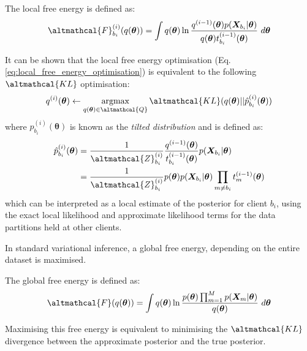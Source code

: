 \begin{definition}
	The local free energy is defined as:
	\begin{align}
	\altmathcal{F}_{b_i}^{(i)}(q(\bm{\theta})) = \int q(\bm{\theta}) \ln \frac{q^{(i-1)}(\bm{\theta}) p(\bm{X}_{b_i}|\bm{\theta})}{q(\bm{\theta}) t_{b_i}^{(i-1)}(\bm{\theta})}\ d\bm{\theta} \label{eq:def-local-free-energy}
	\end{align}
\end{definition}
It can be shown that the local free energy optimisation (Eq. \ref{eq:local_free_energy_optimisation}) is equivalent to the following $\altmathcal{KL}$ optimisation:
\begin{align}
q^{(i)}(\bm{\theta}) \leftarrow  \mathop{\mathrm{argmax}}_{q(\bm{\theta}) \in \altmathcal{Q}} \altmathcal{KL}(q(\bm{\theta}) || \hat{p}^{(i)}_{b_i}(\bm{\theta})) \label{eq:free_energy_kl}
\end{align}
where $\hat{p}^{(i)}_{b_i}(\bm{\theta})$ is known as the \emph{tilted distribution} and is defined as:
\begin{align}
\hat{p}^{(i)}_{b_i}(\bm{\theta}) &= \frac{1}{\altmathcal{Z}^{(i)}_{b_i}} \frac{q^{(i-1)}(\bm{\theta})}{t_{b_i}^{(i-1)}(\bm{\theta})} p(\bm{X}_{b_i}|\bm{\theta}) \\ &=  \frac{1}{\altmathcal{Z}^{(i)}_{b_i}} p(\bm{\theta}) p(\bm{X}_{b_i}| \bm{\theta}) \prod_{m \neq b_i} t_m^{(i-1)}(\bm{\theta})
\end{align}
which can be interpreted as a local estimate of the posterior for client $b_i$, using the exact local likelihood and approximate likelihood terms for the data partitions held at other clients.  

In standard variational inference, a global free energy, depending on the entire dataset is maximised. 
\begin{definition}
	The global free energy is defined as:
	\begin{align}
	\altmathcal{F}(q(\bm{\theta})) = \int q(\bm{\theta}) \ln \frac{p(\bm{\theta})\prod_{m=1}^M p(\bm{X}_m | \bm{\theta})}{q(\bm{\theta})}\ d\bm{\theta}
	\end{align}
\end{definition}
Maximising this free energy is equivalent to minimising the $\altmathcal{KL}$ divergence between the approximate posterior and the true posterior. \cite{Bishop:2006}

